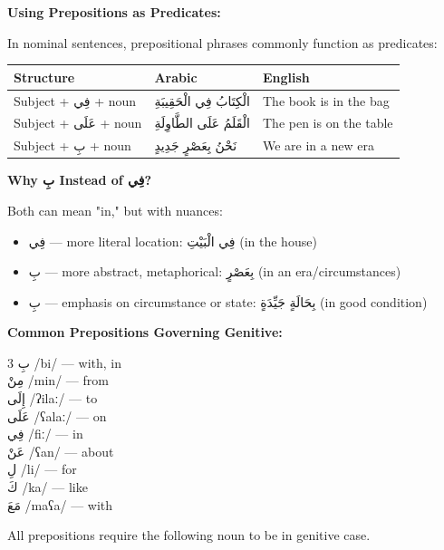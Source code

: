\documentclass[letterpaper,12pt]{article}
\begin{document}
\begin{tcolorbox}[colback=boxcolor,colframe=headercolor,breakable]
\textbf{Using Prepositions as Predicates:}

In nominal sentences, prepositional phrases commonly function as predicates:

\begin{tabular}{|l|p{5cm}|p{5cm}|}
\hline
\textbf{Structure} & \textbf{Arabic} & \textbf{English} \\
\hline
Subject + \textarabic{فِي} + noun & \textarabic{الْكِتَابُ فِي الْحَقِيبَةِ} & The book is in the bag \\
\hline
Subject + \textarabic{عَلَى} + noun & \textarabic{الْقَلَمُ عَلَى الطَّاوِلَةِ} & The pen is on the table \\
\hline
Subject + \textarabic{بِ} + noun & \textarabic{نَحْنُ بِعَصْرٍ جَدِيدٍ} & We are in a new era \\
\hline
\end{tabular}

\vspace{0.5em}
\textbf{Why \textarabic{بِ} Instead of \textarabic{فِي}?}

Both can mean "in," but with nuances:
\begin{itemize}
\item \textarabic{فِي} — more literal location: \textarabic{فِي الْبَيْتِ} (in the house)
\item \textarabic{بِ} — more abstract, metaphorical: \textarabic{بِعَصْرٍ} (in an era/circumstances)
\item \textarabic{بِ} — emphasis on circumstance or state: \textarabic{بِحَالَةٍ جَيِّدَةٍ} (in good condition)
\end{itemize}

\vspace{0.5em}
\textbf{Common Prepositions Governing Genitive:}

\begin{multicols}{3}
\textarabic{بِ} /bi/ — with, in\\
\textarabic{مِنْ} /min/ — from\\
\textarabic{إِلَى} /ʔilaː/ — to\\
\textarabic{عَلَى} /ʕalaː/ — on\\
\textarabic{فِي} /fiː/ — in\\
\textarabic{عَنْ} /ʕan/ — about\\
\textarabic{لِ} /li/ — for\\
\textarabic{كَ} /ka/ — like\\
\textarabic{مَعَ} /maʕa/ — with\\
\end{multicols}

All prepositions require the following noun to be in genitive case.
\end{tcolorbox}
\end{document}
